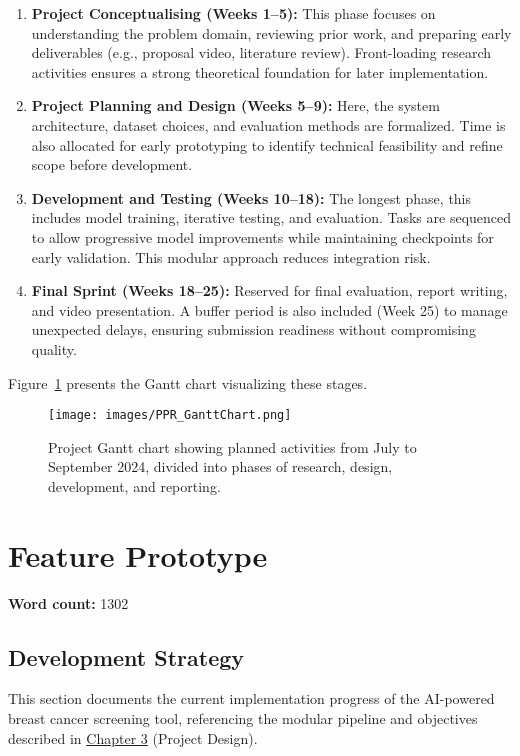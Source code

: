 \documentclass[12pt]{article}
\begin{document}
\begin{enumerate}
    \item \textbf{Project Conceptualising (Weeks 1–5):} This phase focuses on understanding the problem domain, reviewing prior work, and preparing early deliverables (e.g., proposal video, literature review). Front-loading research activities ensures a strong theoretical foundation for later implementation.

    \item \textbf{Project Planning and Design (Weeks 5–9):} Here, the system architecture, dataset choices, and evaluation methods are formalized. Time is also allocated for early prototyping to identify technical feasibility and refine scope before development.

    \item \textbf{Development and Testing (Weeks 10–18):} The longest phase, this includes model training, iterative testing, and evaluation. Tasks are sequenced to allow progressive model improvements while maintaining checkpoints for early validation. This modular approach reduces integration risk.

    \item \textbf{Final Sprint (Weeks 18–25):} Reserved for final evaluation, report writing, and video presentation. A buffer period is also included (Week 25) to manage unexpected delays, ensuring submission readiness without compromising quality.
\end{enumerate}

Figure~\ref{fig:gantt} presents the Gantt chart visualizing these stages. 

\begin{figure}[H]
    \centering
    \texttt{[image: images/PPR\_GanttChart.png]}
    \caption{Project Gantt chart showing planned activities from July to September 2024, divided into phases of research, design, development, and reporting.}
    \label{fig:gantt}
\end{figure}

\newpage
\section{Feature Prototype}
\noindent\textbf{Word count:} 1302
\vspace{1em}

\subsection{Development Strategy}
This section documents the current implementation progress of the AI-powered breast cancer screening tool, referencing the modular pipeline and objectives described in \hyperref[chapter3]{Chapter 3} (Project Design).
\end{document}
